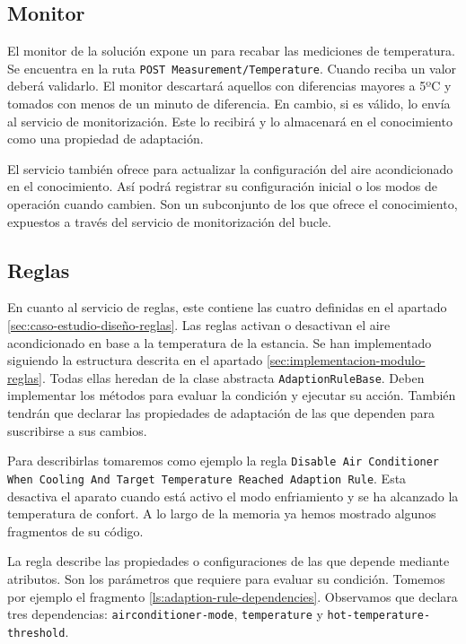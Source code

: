 \subsection{Monitor}

El monitor de la solución expone un  para recabar las mediciones de temperatura. Se encuentra en la ruta \texttt{POST Measurement/Temperature}. Cuando reciba un valor deberá validarlo. El monitor descartará aquellos con diferencias mayores a 5ºC y tomados con menos de un minuto de diferencia. En cambio, si es válido, lo envía al servicio de monitorización. Este lo recibirá y lo almacenará en el conocimiento como una propiedad de adaptación.

El servicio también ofrece  para actualizar la configuración del aire acondicionado en el conocimiento. Así podrá registrar su configuración inicial o los modos de operación cuando cambien. Son un subconjunto de los que ofrece el conocimiento, expuestos a través del servicio de monitorización del bucle.

\subsection{Reglas}

En cuanto al servicio de reglas, este contiene las cuatro definidas en el apartado \ref{sec:caso-estudio-diseño-reglas}. Las reglas activan o desactivan el aire acondicionado en base a la temperatura de la estancia. Se han implementado siguiendo la estructura descrita en el apartado \ref{sec:implementacion-modulo-reglas}. Todas ellas heredan de la clase abstracta \texttt{AdaptionRuleBase}. Deben implementar los métodos para evaluar la condición y ejecutar su acción. También tendrán que declarar las propiedades de adaptación de las que dependen para suscribirse a sus cambios.

Para describirlas tomaremos como ejemplo la regla \texttt{Disable Air Conditioner When Cooling And Target Temperature Reached Adaption Rule}. Esta desactiva el aparato cuando está activo el modo enfriamiento y se ha alcanzado la temperatura de confort. A lo largo de la memoria ya hemos mostrado algunos fragmentos de su código.

La regla describe las propiedades o configuraciones de las que depende mediante atributos. Son los parámetros que requiere para evaluar su condición. Tomemos por ejemplo el fragmento \ref{ls:adaption-rule-dependencies}. Observamos que declara tres dependencias: \texttt{airconditioner-mode}, \texttt{temperature} y \texttt{hot-temperature-threshold}.

